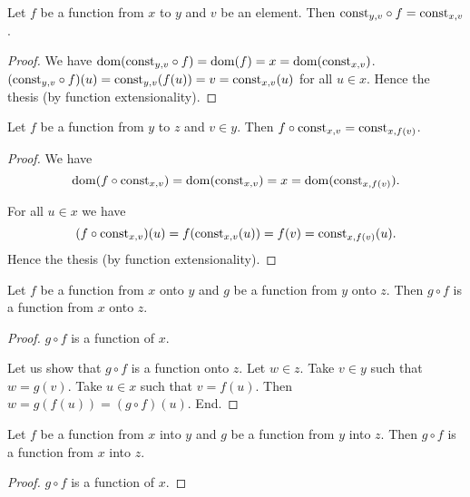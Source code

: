 \documentclass[../../sets-and-functions.ftl.tex]{subfiles}
\begin{document}
\begin{forthel}
    \begin{proposition}[SF 02 01 558108]
      Let $f$ be a function from $x$ to $y$ and $v$ be an element.
      Then $\mbox{const}_{y,v} \circ f = \mbox{const}_{x,v}$.
    \end{proposition}
    \begin{proof}
      We have $\operatorname{dom}(\mbox{const}_{y,v} \circ f) = \operatorname{dom}(f) = x = \operatorname{dom}(\mbox{const}_{x,v})$.
      $(\mbox{const}_{y,v} \circ f)(u) = \mbox{const}_{y,v}(f(u)) = v = \mbox{const}_{x,v}(u)$ for all $u \in x$.
      Hence the thesis (by function extensionality).
    \end{proof}

    \begin{proposition}[SF 02 01 795869]
      Let $f$ be a function from $y$ to $z$ and $v \in y$.
      Then $f \circ \mbox{const}_{x,v} = \mbox{const}_{x,f(v)}$.
    \end{proposition}
    \begin{proof}
      We have
      \[  \operatorname{dom}(f \circ \mbox{const}_{x,v})
          = \operatorname{dom}(\mbox{const}_{x,v})
          = x
          = \operatorname{dom}(\mbox{const}_{x,f(v)}). \]

      For all $u \in x$ we have
      \[  (f \circ \mbox{const}_{x,v})(u)
          = f(\mbox{const}_{x,v}(u))
          = f(v)
          = \mbox{const}_{x,f(v)}(u). \]
      Hence the thesis (by function extensionality).
    \end{proof}

    \begin{proposition}[SF 02 01 205975]
      Let $f$ be a function from $x$ onto $y$ and $g$ be a function from $y$ onto $z$.
      Then $g \circ f$ is a function from $x$ onto $z$.
    \end{proposition}
    \begin{proof}
      $g \circ f$ is a function of $x$.

      Let us show that $g \circ f$ is a function onto $z$.
        Let $w \in z$.
        Take $v \in y$ such that $w = g(v)$.
        Take $u \in x$ such that $v = f(u)$.
        Then $w = g(f(u)) = (g \circ f)(u)$.
      End.
    \end{proof}

    \begin{proposition}[SF 02 01 784576]
      Let $f$ be a function from $x$ into $y$ and $g$ be a function from $y$ into $z$.
      Then $g \circ f$ is a function from $x$ into $z$.
    \end{proposition}
    \begin{proof}
      $g \circ f$ is a function of $x$.


\end{proof}
\end{forthel}
\end{document}
